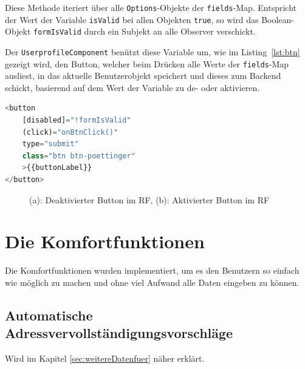 Diese Methode iteriert über alle \texttt{Options}-Objekte der \texttt{fields}-Map. Entspricht der Wert der Variable \texttt{isValid} bei allen Objekten \texttt{true}, so wird das Boolean-Objekt \texttt{formIsValid} durch ein Subjekt an alle Observer verschickt.

Der \texttt{UserprofileComponent} benützt diese Variable um, wie im Listing~\ref{lst:btn} gezeigt wird, den Button, welcher beim Drücken alle Werte der \texttt{fields}-Map ausliest, in das aktuelle Benutzerobjekt speichert und dieses zum Backend schickt, basierend auf dem Wert der Variable zu de- oder aktivieren.

\begin{lstlisting}[caption={Der Button im \texttt{UserprofileComponent}, welcher de- oder aktiviert wird}, language=JavaScript,label={lst:btn}]
<button 
	[disabled]="!formIsValid" 
	(click)="onBtnClick()" 
	type="submit"
	class="btn btn-poettinger"
	>{{buttonLabel}}
</button>
\end{lstlisting}

\begin{figure}[H]
	\centering
	\qquad
	\caption{(a): Deaktivierter Button im RF, (b): Aktivierter Button im RF}%
\end{figure}

\section{Die Komfortfunktionen}
Die Komfortfunktionen wurden implementiert, um es den Benutzern so einfach wie möglich zu machen und ohne viel Aufwand alle Daten eingeben zu können.

\subsection{Automatische Adressvervollständigungsvorschläge}

Wird im Kapitel \ref{sec:weitereDatenfuer} näher erklärt.

